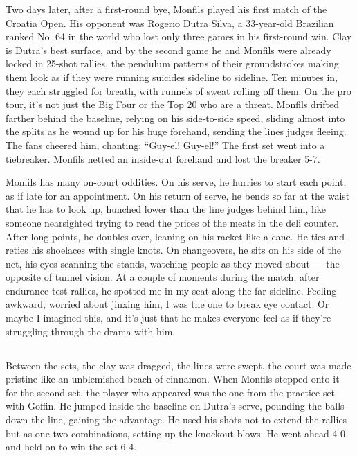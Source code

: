 Two days later, after a first-round bye, Monfils played his first match
of the Croatia Open. His opponent was Rogerio Dutra Silva, a 33-year-old
Brazilian ranked No. 64 in the world who lost only three games in his
first-round win. Clay is Dutra's best surface, and by the second game he
and Monfils were already locked in 25-shot rallies, the pendulum
patterns of their groundstrokes making them look as if they were running
suicides sideline to sideline. Ten minutes in, they each struggled for
breath, with runnels of sweat rolling off them. On the pro tour, it's
not just the Big Four or the Top 20 who are a threat. Monfils drifted
farther behind the baseline, relying on his side-to-side speed, sliding
almost into the splits as he wound up for his huge forehand, sending the
lines judges fleeing. The fans cheered him, chanting: ``Guy-el!
Guy-el!'' The first set went into a tiebreaker. Monfils netted an
inside-out forehand and lost the breaker 5-7.

Monfils has many on-court oddities. On his serve, he hurries to start
each point, as if late for an appointment. On his return of serve, he
bends so far at the waist that he has to look up, hunched lower than the
line judges behind him, like someone nearsighted trying to read the
prices of the meats in the deli counter. After long points, he doubles
over, leaning on his racket like a cane. He ties and reties his
shoelaces with single knots. On changeovers, he sits on his side of the
net, his eyes scanning the stands, watching people as they moved about
--- the opposite of tunnel vision. At a couple of moments during the
match, after endurance-test rallies, he spotted me in my seat along the
far sideline. Feeling awkward, worried about jinxing him, I was the one
to break eye contact. Or maybe I imagined this, and it's just that he
makes everyone feel as if they're struggling through the drama with him.

\hypertarget{-2}{%
\subsection{}\label{-2}}

Between the sets, the clay was dragged, the lines were swept, the court
was made pristine like an unblemished beach of cinnamon. When Monfils
stepped onto it for the second set, the player who appeared was the one
from the practice set with Goffin. He jumped inside the baseline on
Dutra's serve, pounding the balls down the line, gaining the advantage.
He used his shots not to extend the rallies but as one-two combinations,
setting up the knockout blows. He went ahead 4-0 and held on to win the
set 6-4.

